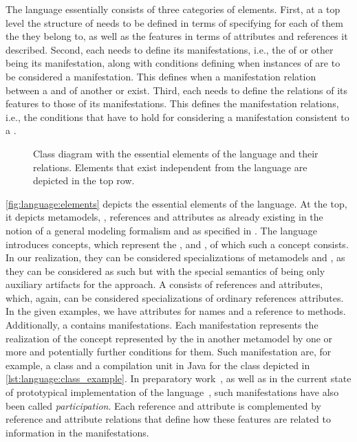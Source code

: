 The \commonalities language essentially consists of three categories of elements.
First, at a top level the structure of \commonalities needs to be defined in terms of specifying for each of them the \conceptmetamodels they belong to, as well as the features in terms of attributes and references it described.
Second, each \commonality needs to define its manifestations, i.e., the \metaclasses of \concretemetamodels or other \conceptmetamodels being its manifestation, along with conditions defining when instances of \metaclasses are to be considered a manifestation.
This defines when a manifestation relation between a \commonality and \metaclasses of another \conceptmetamodel or \concretemetamodel exist.
Third, each \commonality needs to define the relations of its features to those of its manifestations.
This defines the manifestation relations, i.e., the conditions that have to hold for considering a manifestation consistent to a \commonality.

\begin{figure}
    \centering
    
    \caption[\commonalities language elements]{Class diagram with the essential elements of the \commonalities language and their relations. Elements that exist independent from the language are depicted in the top row.}
    \label{fig:language:elements}
\end{figure}

\autoref{fig:language:elements} depicts the essential elements of the \commonalities language.
At the top, it depicts metamodels, \metaclasses, references and attributes as already existing in the notion of a general modeling formalism and as specified in \concretemetamodels.
The language introduces concepts, which represent the \conceptmetamodels, and \commonalities, of which such a concept consists.
In our realization, they can be considered specializations of metamodels and \metaclasses, as they can be considered as such but with the special semantics of being only auxiliary artifacts for the \commonalities approach.
A \commonality consists of \commonality references and attributes, which, again, can be considered specializations of ordinary references attributes.
In the given examples, we have attributes for names and a reference to methods.
Additionally, a \commonality contains manifestations.
Each manifestation represents the realization of the concept represented by the \commonality in another metamodel by one or more  \metaclasses and potentially further conditions for them.
Such manifestation are, for example, a class and a compilation unit in Java for the class \commonality depicted in \autoref{lst:language:class_example}.
In preparatory work~, as well as in the current state of prototypical implementation of the language~, such manifestations have also been called \emph{participation}.
Each \commonality reference and attribute is complemented by reference and attribute relations that define how these features are related to information in the manifestations.

